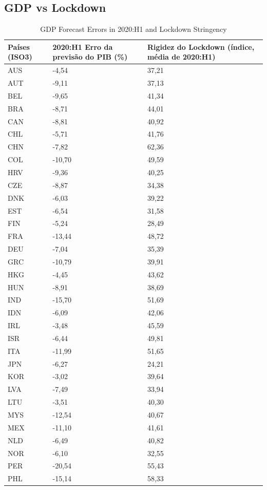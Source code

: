 \documentclass{SelfArx}
\begin{document}
\subsection*{GDP vs Lockdown}
\label{sec:org483b167}
\begin{table}[htbp]
\caption{\label{IMF_fig_1}GDP Forecast Errors in 2020:H1 and Lockdown Stringency}
\centering
\begin{tabular}{lll}
\hline
Países (ISO3) & 2020:H1 Erro da previsão do PIB (\%) & Rigidez do Lockdown (índice, média de 2020:H1)\\
\hline
AUS & -4,54 & 37,21\\
AUT & -9,11 & 37,13\\
BEL & -9,65 & 41,34\\
BRA & -8,71 & 44,01\\
CAN & -8,81 & 40,92\\
CHL & -5,71 & 41,76\\
CHN & -7,82 & 62,36\\
COL & -10,70 & 49,59\\
HRV & -9,36 & 40,25\\
CZE & -8,87 & 34,38\\
DNK & -6,03 & 39,22\\
EST & -6,54 & 31,58\\
FIN & -5,24 & 28,49\\
FRA & -13,44 & 48,72\\
DEU & -7,04 & 35,39\\
GRC & -10,79 & 39,91\\
HKG & -4,45 & 43,62\\
HUN & -8,91 & 38,69\\
IND & -15,70 & 51,69\\
IDN & -6,09 & 42,06\\
IRL & -3,48 & 45,59\\
ISR & -6,44 & 49,81\\
ITA & -11,99 & 51,65\\
JPN & -6,27 & 24,21\\
KOR & -3,02 & 39,64\\
LVA & -7,49 & 33,94\\
LTU & -3,51 & 40,30\\
MYS & -12,54 & 40,67\\
MEX & -11,10 & 41,61\\
NLD & -6,49 & 40,82\\
NOR & -6,10 & 32,55\\
PER & -20,54 & 55,43\\
PHL & -15,14 & 58,33\\

\end{tabular}
\end{table}
\end{document}
